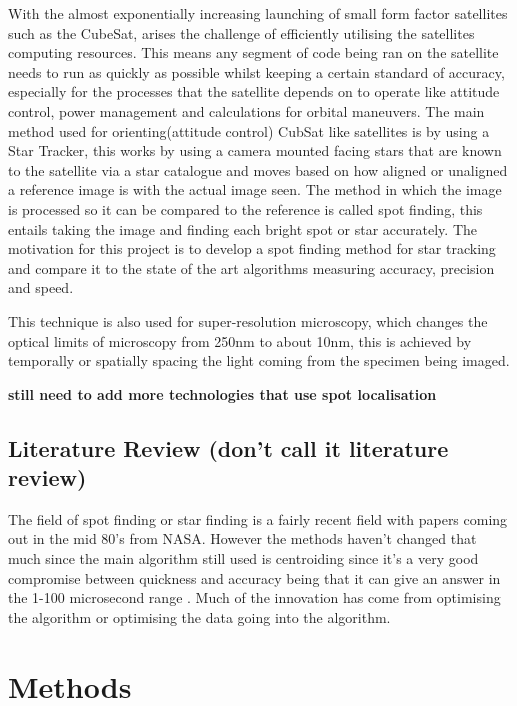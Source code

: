 \documentclass[aps,pra,a4paper,nofootinbib,onecolumn,tightenlines,longbibliography,12pt,amsfonts,amssymb,amsmath,floatfix]{revtex4-2} %
\begin{document}
  With the almost exponentially increasing launching of small form factor
  satellites such as the CubeSat, arises the challenge of efficiently utilising
  the satellites computing resources. This means any segment of code being ran on
  the satellite needs to run as quickly as possible whilst keeping a certain
  standard of accuracy, especially for the processes that the satellite depends
  on to operate like attitude control, power management and calculations for
  orbital maneuvers. The main method used for orienting(attitude control) CubSat
  like satellites is by using a Star Tracker, this works by using a camera mounted
  facing stars that are known to the satellite via a star catalogue and moves
  based on how aligned or unaligned a reference image is with the actual image
  seen.\cite{calitz2015design} The method in which the image is processed so it
  can be compared to the reference is called spot finding, this entails taking
  the image and finding each bright spot or star accurately. The motivation for
  this project is to develop a spot finding method for star tracking and compare
  it to the state of the art algorithms measuring accuracy, precision and speed.

  This technique is also used for super-resolution microscopy, which changes the
  optical limits of microscopy from 250nm to about 10nm, this is achieved by
  temporally or spatially spacing the light coming from the specimen being
  imaged. 

  \textbf{still need to add more technologies that use spot localisation}
  
  \subsection{Literature Review (don't call it literature review)} %
  \label{sub:Literature Review (don't call it literature review)}
  
  
  The field of spot finding or star finding is a fairly recent field with papers
  coming out in the mid 80's from NASA. However the methods haven't changed that
  much since the main algorithm still used is centroiding since it's a very good
  compromise between quickness and accuracy being that it can give an answer in
  the 1-100 microsecond range \cite{delabie2014accurate}. Much of the innovation
  has come from optimising the algorithm or optimising the data going into the
  algorithm. 


\section{Methods} %
\label{sec:Methods}
\end{document}
